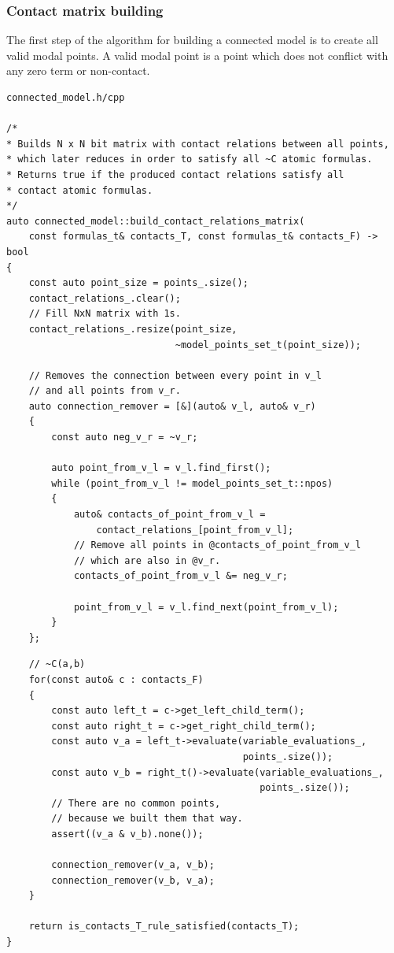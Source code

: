 \documentclass{article}
\begin{document}
	\subsubsection*{Contact matrix building}
	The first step of the algorithm for building a connected model is to create all valid modal points. A valid modal point is a point which does not conflict with any zero term or non-contact.
\\
\begin{lstlisting}
connected_model.h/cpp

/*
* Builds N x N bit matrix with contact relations between all points,
* which later reduces in order to satisfy all ~C atomic formulas.
* Returns true if the produced contact relations satisfy all
* contact atomic formulas.
*/
auto connected_model::build_contact_relations_matrix(
    const formulas_t& contacts_T, const formulas_t& contacts_F) -> bool
{
    const auto point_size = points_.size();
    contact_relations_.clear();
    // Fill NxN matrix with 1s.
    contact_relations_.resize(point_size,
                              ~model_points_set_t(point_size));

    // Removes the connection between every point in v_l
    // and all points from v_r.
    auto connection_remover = [&](auto& v_l, auto& v_r)
    {
        const auto neg_v_r = ~v_r;

        auto point_from_v_l = v_l.find_first();
        while (point_from_v_l != model_points_set_t::npos)
        {
            auto& contacts_of_point_from_v_l =
                contact_relations_[point_from_v_l];
            // Remove all points in @contacts_of_point_from_v_l
            // which are also in @v_r.
            contacts_of_point_from_v_l &= neg_v_r;

            point_from_v_l = v_l.find_next(point_from_v_l);
        }
    };
\end{lstlisting}
\newpage
\begin{lstlisting}
    // ~C(a,b)
    for(const auto& c : contacts_F)
    {
        const auto left_t = c->get_left_child_term();
        const auto right_t = c->get_right_child_term();
        const auto v_a = left_t->evaluate(variable_evaluations_,
                                          points_.size());
        const auto v_b = right_t()->evaluate(variable_evaluations_,
                                             points_.size());
		// There are no common points,
		// because we built them that way.
        assert((v_a & v_b).none());

        connection_remover(v_a, v_b);
        connection_remover(v_b, v_a);
    }

    return is_contacts_T_rule_satisfied(contacts_T);
}
\end{lstlisting}
\end{document}
